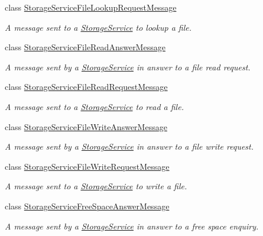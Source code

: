 \begin{DoxyCompactItemize}
class \hyperlink{classwrench_1_1_storage_service_file_lookup_request_message}{Storage\+Service\+File\+Lookup\+Request\+Message}
\begin{DoxyCompactList}\small\item\em A message sent to a \hyperlink{classwrench_1_1_storage_service}{Storage\+Service} to lookup a file. \end{DoxyCompactList}\item 
class \hyperlink{classwrench_1_1_storage_service_file_read_answer_message}{Storage\+Service\+File\+Read\+Answer\+Message}
\begin{DoxyCompactList}\small\item\em A message sent by a \hyperlink{classwrench_1_1_storage_service}{Storage\+Service} in answer to a file read request. \end{DoxyCompactList}\item 
class \hyperlink{classwrench_1_1_storage_service_file_read_request_message}{Storage\+Service\+File\+Read\+Request\+Message}
\begin{DoxyCompactList}\small\item\em A message sent to a \hyperlink{classwrench_1_1_storage_service}{Storage\+Service} to read a file. \end{DoxyCompactList}\item 
class \hyperlink{classwrench_1_1_storage_service_file_write_answer_message}{Storage\+Service\+File\+Write\+Answer\+Message}
\begin{DoxyCompactList}\small\item\em A message sent by a \hyperlink{classwrench_1_1_storage_service}{Storage\+Service} in answer to a file write request. \end{DoxyCompactList}\item 
class \hyperlink{classwrench_1_1_storage_service_file_write_request_message}{Storage\+Service\+File\+Write\+Request\+Message}
\begin{DoxyCompactList}\small\item\em A message sent to a \hyperlink{classwrench_1_1_storage_service}{Storage\+Service} to write a file. \end{DoxyCompactList}\item 
class \hyperlink{classwrench_1_1_storage_service_free_space_answer_message}{Storage\+Service\+Free\+Space\+Answer\+Message}
\begin{DoxyCompactList}\small\item\em A message sent by a \hyperlink{classwrench_1_1_storage_service}{Storage\+Service} in answer to a free space enquiry. \end{DoxyCompactList}\item 

\end{DoxyCompactItemize}
